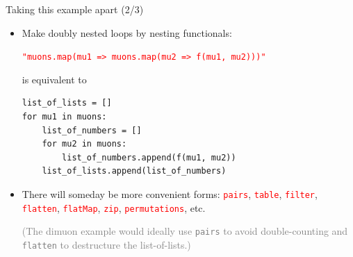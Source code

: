 \documentclass{beamer}
\begin{document}
\begin{frame}[fragile]{Taking this example apart (2/3)}
\begin{itemize}\setlength{\itemsep}{0.5 cm}
\item Make doubly nested loops by nesting functionals:

\mbox{\tt\small \textcolor{red}{"muons.map(mu1 => muons.map(mu2 => f(mu1, mu2)))"}\hspace{-1 cm}}

is equivalent to

\small
\begin{verbatim}
list_of_lists = []
for mu1 in muons:
    list_of_numbers = []
    for mu2 in muons:
        list_of_numbers.append(f(mu1, mu2))
    list_of_lists.append(list_of_numbers)
\end{verbatim}

\item There will someday be more convenient forms: \textcolor{red}{\tt pairs}, \textcolor{red}{\tt table}, \textcolor{red}{\tt filter}, \textcolor{red}{\tt flatten}, \textcolor{red}{\tt flatMap}, \textcolor{red}{\tt zip}, \textcolor{red}{\tt permutations}, etc.

\vspace{0.2 cm}
\textcolor{gray}{(The dimuon example would ideally use \textcolor{lightred}{\tt pairs} to avoid double-counting and \textcolor{lightred}{\tt flatten} to destructure the list-of-lists.)}
\end{itemize}
\end{frame}
\end{document}

